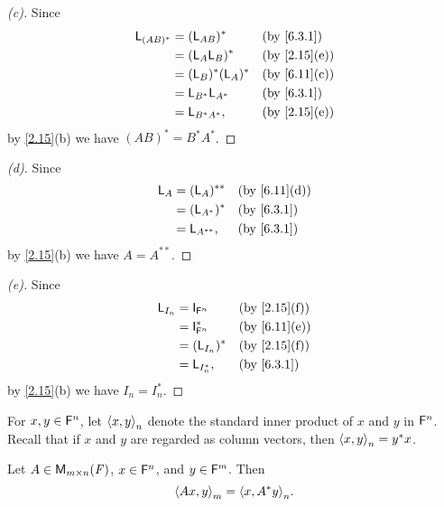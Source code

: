 \begin{proof}[(c)]
  Since
  \begin{align*}
    \L_{(AB)^*} & = (\L_{AB})^*       &  & \by{6.3.1}   \\
                & = (\L_A \L_B)^*     &  & \by{2.15}[e] \\
                & = (\L_B)^* (\L_A)^* &  & \by{6.11}[c] \\
                & = \L_{B^*} \L_{A^*} &  & \by{6.3.1}   \\
                & = \L_{B^* A^*},     &  & \by{2.15}[e]
  \end{align*}
  by \cref{2.15}(b) we have \((AB)^* = B^* A^*\).
\end{proof}

\begin{proof}[(d)]
  Since
  \begin{align*}
    \L_A & = (\L_A)^{**}  &  & \by{6.11}[d] \\
         & = (\L_{A^*})^* &  & \by{6.3.1}   \\
         & = \L_{A^{**}}, &  & \by{6.3.1}
  \end{align*}
  by \cref{2.15}(b) we have \(A = A^{**}\).
\end{proof}

\begin{proof}[(e)]
  Since
  \begin{align*}
    \L_{I_n} & = \IT[\vs{F}^n]   &  & \by{2.15}[f] \\
             & = \IT[\vs{F}^n]^* &  & \by{6.11}[e] \\
             & = (\L_{I_n})^*    &  & \by{2.15}[f] \\
             & = \L_{I_n^*},     &  & \by{6.3.1}
  \end{align*}
  by \cref{2.15}(b) we have \(I_n = I_n^*\).
\end{proof}

\begin{defn}\label{6.3.3}
  For \(x, y \in \mathsf{F}^n\), let \(\left\langle x, y\right\rangle_n\) denote the standard inner product of \(x\) and \(y\) in \(\mathsf{F}^n\).
  Recall that if \(x\) and \(y\) are regarded as column vectors, then \(\left\langle x, y\right\rangle_n = y^* x\).
\end{defn}

\begin{lem}\label{6.3.4}
  Let \(A \in \ms\), \(x \in \mathsf{F}^n\), and \(y \in \mathsf{F}^m\).
  Then
  \[
    \inn{Ax, y}_m = \inn{x, A^* y}_n.
  \]
\end{lem}

